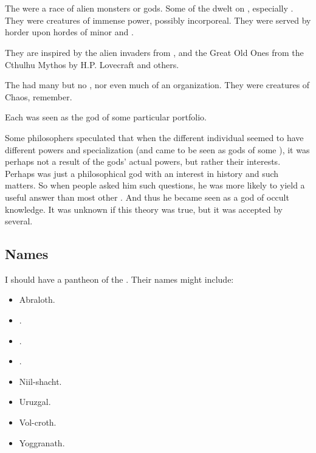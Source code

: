 \section{\XzaiShanns}
\index{\xzaishann}
The \xzaishanns{} were a race of alien monsters or gods. 
Some of the dwelt on \Miith, especially . 
They were creatures of immense power, possibly incorporeal. 
They were served by horder upon hordes of minor \mdaemons{} and \mdaemons.

They are inspired by the alien invaders from , and the Great Old Ones from the Cthulhu Mythos by H.P. Lovecraft and others. 

The \xss{} had many  but no , nor even much of an organization. 
They were creatures of Chaos, remember. 

Each \xs was seen as the god of some particular portfolio. 

Some \draconian philosophers speculated that when the different individual \xss seemed to have different powers and specialization (and came to be seen as gods of some ), it was perhaps not a result of the gods' actual powers, but rather their interests.
Perhaps \NerranKoss was just a philosophical god with an interest in history and such matters. 
So when people asked him such questions, he was more likely to yield a useful answer than most other \xss.
And thus he became seen as a god of occult knowledge. 
It was unknown if this theory was true, but it was accepted by several. 








\subsection{Names}
I should have a pantheon of the . Their names might include: 

\begin{itemize}
  \item Abraloth. 
  \item {}. 
  \item {}. 
  \item {}. 
  \item Niil-shacht.
  \item Uruzgal. 
  \item Vol-croth. 
  \item Yoggranath. 
\end{itemize}

